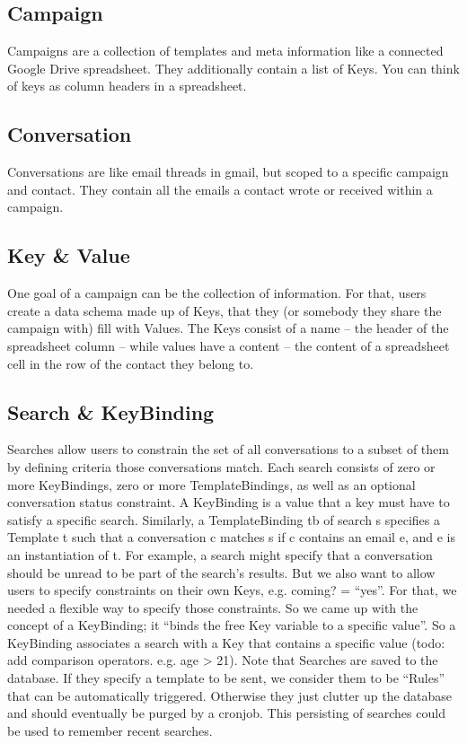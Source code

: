 \subsection{Campaign}

Campaigns are a collection of templates and meta information like a connected Google Drive spreadsheet. They additionally contain a list of Keys. You can think of keys as column headers in a spreadsheet.

\subsection{Conversation}

Conversations are like email threads in gmail, but scoped to a specific campaign and contact. They contain all the emails a contact wrote or received within a campaign.

\subsection{Key \& Value}

One goal of a campaign can be the collection of information. For that, users create a data schema made up of Keys, that they (or somebody they share the campaign with) fill with Values. The Keys consist of a name – the header of the spreadsheet column – while values have a content – the content of a spreadsheet cell in the row of the contact they belong to.

\subsection{Search \& KeyBinding}

Searches allow users to constrain the set of all conversations to a subset of them by defining criteria those conversations match. Each search consists of zero or more KeyBindings, zero or more TemplateBindings, as well as an optional conversation status constraint. A KeyBinding is a value that a key must have to satisfy a specific search. Similarly, a TemplateBinding tb of search s specifies a Template t such that a conversation c matches s if c contains an email e, and e is an instantiation of t.
For example, a search might specify that a conversation should be unread to be part of the search’s results. But we also want to allow users to specify constraints on their own Keys, e.g. coming? = “yes”. For that, we needed a flexible way to specify those constraints. So we came up with the concept of a KeyBinding; it “binds the free Key variable to a specific value”. So a KeyBinding associates a search with a Key that contains a specific value (todo: add comparison operators. e.g. age > 21).
Note that Searches are saved to the database. If they specify a template to be sent, we consider them to be “Rules” that can be automatically triggered. Otherwise they just clutter up the database and should eventually be purged by a cronjob. This persisting of searches could be used to remember recent searches.

